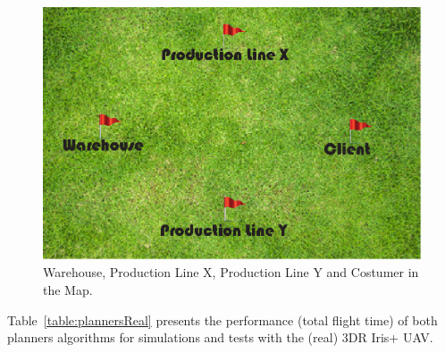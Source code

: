 \documentclass[conference,harvard,brazil,english]{sbatex}
\begin{document}
		\begin{figure}[H]
	\centering
	\includegraphics[width=0.7\columnwidth]{map.eps}
	\caption{Warehouse, Production Line X, Production Line Y and Costumer in the Map.\label{fig:maps}}
	\end{figure}
%           



Table~\ref{table:plannersReal} presents the performance (total flight time) of both planners algorithms for simulations and tests with the (real) 3DR Iris+ UAV.
\end{document}
